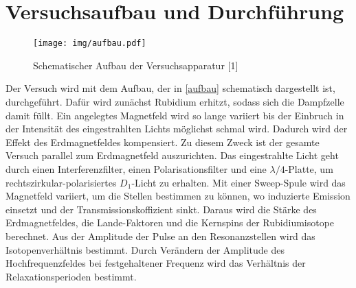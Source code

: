 \section{Versuchsaufbau und Durchführung}

\begin{figure}[h]
\centering
\texttt{[image: img/aufbau.pdf]}
\caption{Schematischer Aufbau der Versuchsapparatur [1]}
\label{aufbau}
\end{figure}

Der Versuch wird mit dem Aufbau, der in \autoref{aufbau} schematisch dargestellt ist, durchgeführt. Dafür wird zunächst
Rubidium erhitzt, sodass sich die Dampfzelle damit füllt. Ein angelegtes Magnetfeld wird so lange variiert bis der Einbruch
in der Intensität des eingestrahlten Lichts möglichst schmal wird. Dadurch wird der Effekt des Erdmagnetfeldes kompensiert.
Zu diesem Zweck ist der gesamte Versuch parallel zum Erdmagnetfeld auszurichten. Das eingestrahlte Licht geht durch einen
Interferenzfilter, einen Polarisationsfilter und eine $\lambda/4$-Platte, um rechtszirkular-polarisiertes $D_1$-Licht zu
erhalten. Mit einer Sweep-Spule wird das Magnetfeld variiert, um die Stellen bestimmen zu können, wo induzierte Emission
einsetzt und der Transmissionskoffizient sinkt. Daraus wird die Stärke des Erdmagnetfeldes, die Lande-Faktoren und die
Kernspins der Rubidiumisotope berechnet. Aus der Amplitude der Pulse an den Resonanzstellen wird das Isotopenverhältnis
bestimmt. Durch Verändern der Amplitude des Hochfrequenzfeldes bei festgehaltener Frequenz wird das Verhältnis der
Relaxationsperioden bestimmt.
